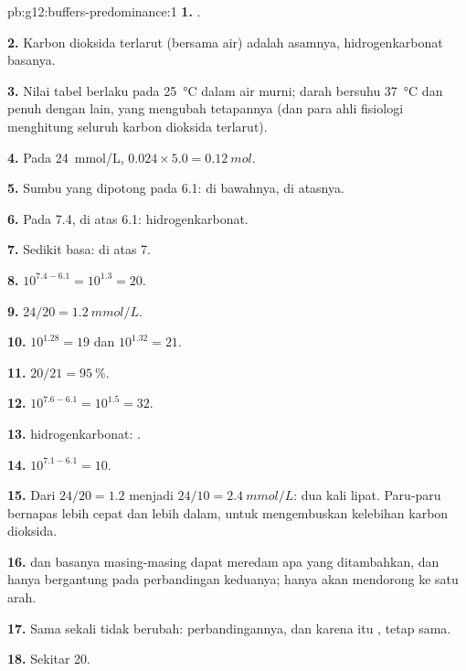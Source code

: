 \begin{solution}{pb:g12:buffers-predominance:1}
\textbf{1.} .

\textbf{2.} Karbon dioksida terlarut (bersama air) adalah asamnya,
hidrogenkarbonat basanya.

\textbf{3.} Nilai tabel berlaku pada \qty{25}{\celsius} dalam air murni;
darah bersuhu \qty{37}{\celsius} dan penuh dengan  lain, yang
mengubah tetapannya (dan para ahli fisiologi menghitung seluruh karbon
dioksida terlarut).

\textbf{4.} Pada \qty{24}{mmol/L}, $0.024 \times 5.0 = \qty{0.12}{mol}$.

\textbf{5.} Sumbu  yang dipotong pada 6.1:  di bawahnya,
 di atasnya.

\textbf{6.} Pada 7.4, di atas 6.1: hidrogenkarbonat.

\textbf{7.} Sedikit basa:  di atas 7.

\textbf{8.} $10^{7.4 - 6.1} = 10^{1.3} = 20$.

\textbf{9.} $24 / 20 = \qty{1.2}{mmol/L}$.

\textbf{10.} $10^{1.28} = 19$ dan $10^{1.32} = 21$.

\textbf{11.} $20/21 = \qty{95}{\percent}$.

\textbf{12.} $10^{7.6 - 6.1} = 10^{1.5} = 32$.

\textbf{13.}  hidrogenkarbonat:
.

\textbf{14.} $10^{7.1 - 6.1} = 10$.

\textbf{15.} Dari $24/20 = 1.2$ menjadi $24/10 = \qty{2.4}{mmol/L}$:
dua kali lipat. Paru-paru bernapas lebih cepat dan lebih dalam, untuk
mengembuskan kelebihan karbon dioksida.

\textbf{16.}  dan basanya masing-masing dapat meredam apa yang
ditambahkan, dan  hanya bergantung pada perbandingan keduanya;  hanya akan mendorong  ke satu arah.

\textbf{17.} Sama sekali tidak berubah: perbandingannya, dan karena itu
, tetap sama.

\textbf{18.} Sekitar 20.
\end{solution}
